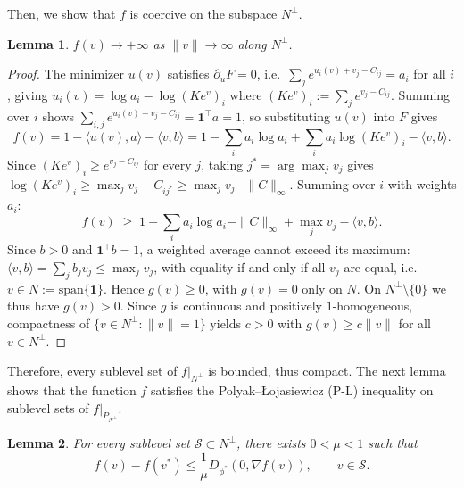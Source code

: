 \documentclass{article}
\theoremstyle{plain}
\newtheorem{lemma}{Lemma}
\theoremstyle{remark}
\begin{document}
Then, we show that $f$ is coercive on the subspace $N^\perp$. 
\begin{lemma}\label{lem:coercivity}
    $f(v)\to+\infty$ as $\|v\|\to\infty$ along $N^\perp$.
\end{lemma}
\begin{proof}
The minimizer $u(v)$ satisfies $\partial_u F = 0$, i.e.\ $\sum_j e^{u_i(v)+v_j-C_{ij}} = a_i$
for all $i$, giving $u_i(v) = \log a_i - \log(Ke^v)_i$ where $(Ke^v)_i := \sum_j e^{v_j - C_{ij}}$.
Summing over $i$ shows $\sum_{i,j} e^{u_i(v)+v_j - C_{ij}} = \mathbf{1}^\top a = 1$,
so substituting $u(v)$ into $F$ gives
\[
  f(v)
  = 1 - \langle u(v), a\rangle - \langle v,b\rangle
  = 1 - \sum_i a_i \log a_i + \sum_i a_i\log(Ke^v)_i - \langle v,b\rangle.
\]
Since $(Ke^v)_i \ge e^{v_j - C_{ij}}$ for every $j$, taking $j^*=\arg\max_j v_j$ gives
$\log(Ke^v)_i \ge \max_j v_j - C_{ij^*} \ge \max_j v_j - \|C\|_\infty$.
Summing over $i$ with weights $a_i$:
\begin{equation}\label{eq:lb}
  f(v) \;\ge\; 1 - \sum_i a_i \log a_i - \|C\|_\infty + \max_j v_j - \langle v,b\rangle.
\end{equation}
Since $b>0$ and $\mathbf{1}^\top b=1$, a weighted average cannot exceed its maximum:
$\langle v,b\rangle = \sum_j b_j v_j \le \max_j v_j$,
with equality if and only if all $v_j$ are equal, i.e.\ $v\in N:=\mathrm{span}\{\mathbf{1}\}$.
Hence $g(v) \ge 0$, with $g(v)=0$ only on $N$. On $N^\perp\setminus\{0\}$ we thus
have $g(v)>0$. Since $g$ is continuous and positively $1$-homogeneous, compactness
of $\{v\in N^\perp:\|v\|=1\}$ yields $c>0$ with $g(v)\ge c\|v\|$ for all $v\in N^\perp$.
\end{proof}
Therefore, every sublevel set of $f|_{N^\perp}$ is bounded, thus compact.
The next lemma shows that the function $f$ satisfies the Polyak--\L ojasiewicz (P-L) inequality on sublevel sets of $f|_{P_{N^\perp}}$.
\begin{lemma}\label{prop:PL}
For every sublevel set $\mathcal S\subset N^\perp$, there exists $0<\mu < 1$ such that
\begin{equation}\label{eq:mirror-PL-appendix}
f(v)-f(v^*)
\le
\frac1\mu D_{\phi^*}(0,\nabla f(v)),
\qquad
v\in\mathcal S.
\end{equation}
\end{lemma}
\end{document}
